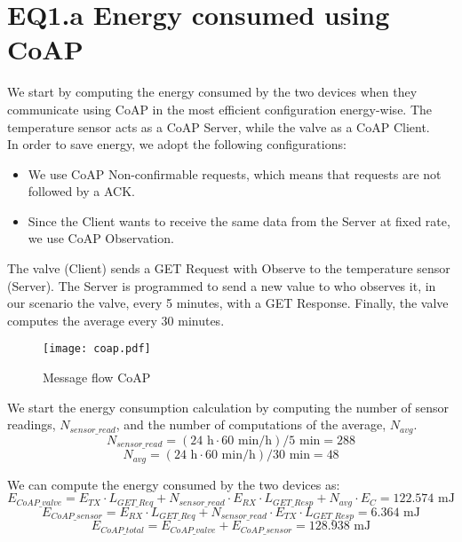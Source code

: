 \section{EQ1.a Energy consumed using CoAP}
We start by computing the energy consumed by the two devices when they communicate using CoAP in the most efficient configuration energy-wise. The temperature sensor acts as a CoAP Server, while the valve as a CoAP Client.\\
In order to save energy, we adopt the following configurations:
\begin{itemize}
\item We use CoAP Non-confirmable requests, which means that requests are not followed by a ACK. 
\item Since the Client wants to receive the same data from the Server at fixed rate, we use CoAP Observation. 
\end{itemize}
The valve (Client) sends a GET Request with Observe to the temperature sensor (Server). The Server is programmed to send a new value to who observes it, in our scenario the valve, every 5 minutes, with a GET Response. Finally, the valve computes the average every 30 minutes.\\
\begin{figure}[H]
    \centering
    \texttt{[image: coap.pdf]}
    \caption{Message flow CoAP}
\end{figure}
We start the energy consumption calculation by computing the number of sensor readings, $N_{sensor\_read}$, and the number of computations of the average, $N_{avg}$.
\[N_{sensor\_read} = (24\text{ h}  \cdot 60 \text{ min/h}) / 5 \text{ min} = 288\]
\[N_{avg} = (24\text{ h}  \cdot 60 \text{ min/h}) / 30 \text{ min} = 48\]

We can compute the energy consumed by the two devices as:
\[E_{CoAP\_valve} = E_{TX} \cdot L_{GET\_Req} + N_{sensor\_read} \cdot E_{RX} \cdot L_{GET\_Resp} + N_{avg} \cdot E_{C} = 122.574 \text{ mJ}\]
\[E_{CoAP\_sensor} = E_{RX} \cdot L_{GET\_Req} + N_{sensor\_read} \cdot E_{TX} \cdot L_{GET\_Resp} = 6.364 \text{ mJ}\]
\[E_{CoAP\_total} = E_{CoAP\_valve} + E_{CoAP\_sensor} = 128.938 \text{ mJ}\]

